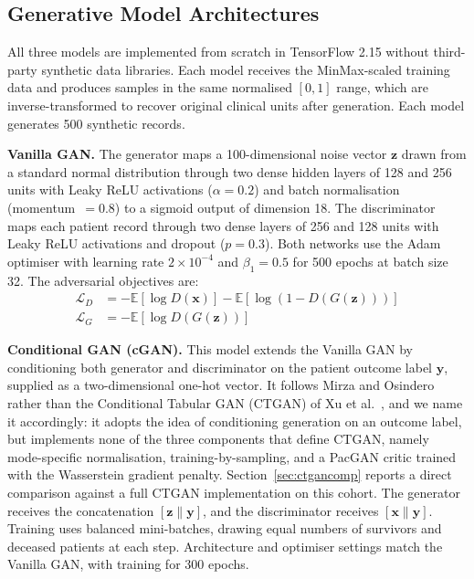 \documentclass[journal]{IEEEtran}
\begin{document}
\subsection{Generative Model Architectures}

All three models are implemented from scratch in TensorFlow 2.15 without third-party synthetic data libraries. Each model receives the MinMax-scaled training data and produces samples in the same normalised $[0, 1]$ range, which are inverse-transformed to recover original clinical units after generation. Each model generates 500 synthetic records.

\textbf{Vanilla GAN.} The generator maps a 100-dimensional noise vector $\mathbf{z}$ drawn from a standard normal distribution through two dense hidden layers of 128 and 256 units with Leaky ReLU activations ($\alpha = 0.2$) and batch normalisation (momentum~$= 0.8$) to a sigmoid output of dimension 18. The discriminator maps each patient record through two dense layers of 256 and 128 units with Leaky ReLU activations and dropout ($p = 0.3$). Both networks use the Adam optimiser with learning rate $2 \times 10^{-4}$ and $\beta_1 = 0.5$ for 500 epochs at batch size 32. The adversarial objectives are:
\begin{align}
\mathcal{L}_D &= -\mathbb{E}[\log D(\mathbf{x})] - \mathbb{E}[\log(1 - D(G(\mathbf{z})))] \\
\mathcal{L}_G &= -\mathbb{E}[\log D(G(\mathbf{z}))]
\end{align}

\textbf{Conditional GAN (cGAN).} This model extends the Vanilla GAN by conditioning both generator and discriminator on the patient outcome label $\mathbf{y}$, supplied as a two-dimensional one-hot vector. It follows Mirza and Osindero \cite{mirza2014} rather than the Conditional Tabular GAN (CTGAN) of Xu et al.\ \cite{xu2019}, and we name it accordingly: it adopts the idea of conditioning generation on an outcome label, but implements none of the three components that define CTGAN, namely mode-specific normalisation, training-by-sampling, and a PacGAN critic trained with the Wasserstein gradient penalty. Section~\ref{sec:ctgancomp} reports a direct comparison against a full CTGAN implementation on this cohort. The generator receives the concatenation $[\mathbf{z} \| \mathbf{y}]$, and the discriminator receives $[\mathbf{x} \| \mathbf{y}]$. Training uses balanced mini-batches, drawing equal numbers of survivors and deceased patients at each step. Architecture and optimiser settings match the Vanilla GAN, with training for 300 epochs.
\end{document}
